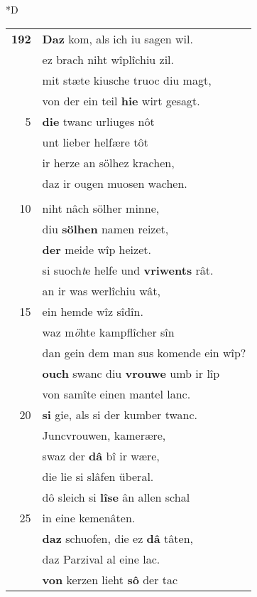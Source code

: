 \documentclass[8pt,a4paper,notitlepage]{article}
\begin{document}
\begin{table}[ht]
\begin{minipage}[t]{0.5\linewidth}
\small
\begin{center}*D
\end{center}
\begin{tabular}{rl}
\textbf{192} & \textbf{Daz} kom, als ich iu sagen wil.\\ 
 & ez brach niht wîplîchiu zil.\\ 
 & mit stæte kiusche truoc diu magt,\\ 
 & von der ein teil \textbf{hie} wirt gesagt.\\ 
5 & \textbf{die} twanc urliuges nôt\\ 
 & unt lieber helfære tôt\\ 
 & ir herze an sölhez krachen,\\ 
 & daz ir ougen muosen wachen.\\ 
 & \textbf{\begin{large}D\end{large}ô} gienc diu küneginne\\ 
10 & niht nâch sölher minne,\\ 
 & diu \textbf{sölhen} namen reizet,\\ 
 & \textbf{der} meide wîp heizet.\\ 
 & si suoch\textit{t}e helfe und \textbf{vriwents} rât.\\ 
 & an ir was werlîchiu wât,\\ 
15 & ein hemde wîz sîdîn.\\ 
 & waz m\textit{ö}hte kampflîcher sîn\\ 
 & dan gein dem man sus komende ein wîp?\\ 
 & \textbf{ouch} swanc diu \textbf{vrouwe} umb ir lîp\\ 
 & von samîte einen mantel lanc.\\ 
20 & \textbf{si} gie, als si der kumber twanc.\\ 
 & Juncvrouwen, kamerære,\\ 
 & swaz der \textbf{dâ} bî ir wære,\\ 
 & die lie si slâfen überal.\\ 
 & dô sleich si \textbf{lîse} ân allen schal\\ 
25 & in eine kemenâten.\\ 
 & \textbf{daz} schuofen, die ez \textbf{dâ} tâten,\\ 
 & daz Parzival al eine lac.\\ 
 & \textbf{von} kerzen lieht \textbf{sô} der tac\\ 

\end{tabular}
\end{minipage}
\end{table}
\end{document}

